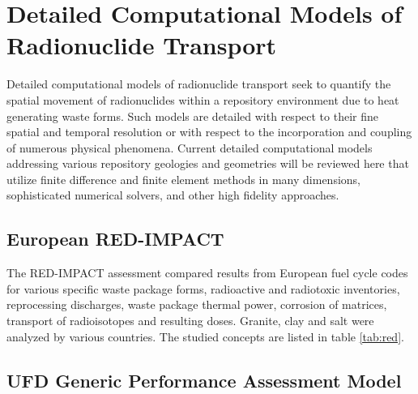 \section{Detailed Computational Models of Radionuclide Transport}
\label{sec:detailed_radionuclide}

Detailed computational models of radionuclide transport seek to quantify the spatial 
movement of radionuclides within a repository environment due to heat 
generating waste forms. Such models are detailed with respect to their fine 
spatial and temporal resolution or with respect to the incorporation and 
coupling of numerous physical phenomena. Current detailed computational models 
addressing various repository geologies and geometries will be reviewed here 
that utilize finite difference and finite element methods in many dimensions, 
sophisticated numerical solvers, and other high fidelity approaches.


\subsection{European RED-IMPACT} 

The RED-IMPACT assessment compared
results from European fuel cycle codes for various specific waste package
forms, radioactive and radiotoxic inventories, reprocessing discharges,  waste
package thermal power, corrosion of matrices, transport of radioisotopes and
resulting doses.  Granite, clay and salt were analyzed by various countries. 
The studied concepts are listed in table \ref{tab:red}.







\subsection{UFD Generic Performance Assessment Model}

